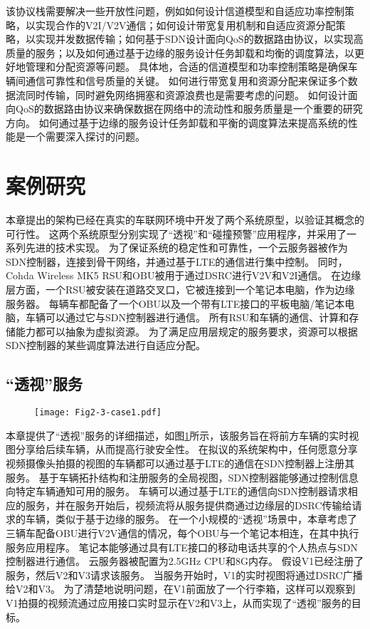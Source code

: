 该协议栈需要解决一些开放性问题，例如如何设计信道模型和自适应功率控制策略，以实现合作的V2I/V2V通信；如何设计带宽复用机制和自适应资源分配策略，以实现并发数据传输；如何基于SDN设计面向QoS的数据路由协议，以实现高质量的服务；以及如何通过基于边缘的服务设计任务卸载和均衡的调度算法，以更好地管理和分配资源等问题。
具体地，合适的信道模型和功率控制策略是确保车辆间通信可靠性和信号质量的关键。
如何进行带宽复用和资源分配来保证多个数据流同时传输，同时避免网络拥塞和资源浪费也是需要考虑的问题。
如何设计面向QoS的数据路由协议来确保数据在网络中的流动性和服务质量是一个重要的研究方向。
如何通过基于边缘的服务设计任务卸载和平衡的调度算法来提高系统的性能是一个需要深入探讨的问题。

\section{案例研究}\label{section 2-4}

本章提出的架构已经在真实的车联网环境中开发了两个系统原型，以验证其概念的可行性。
这两个系统原型分别实现了“透视”和“碰撞预警”应用程序，并采用了一系列先进的技术实现。
为了保证系统的稳定性和可靠性，一个云服务器被作为SDN控制器，连接到骨干网络，并通过基于LTE的通信进行集中控制。
同时，Cohda Wireless MK5 RSU和OBU被用于通过DSRC进行V2V和V2I通信。
在边缘层方面，一个RSU被安装在道路交叉口，它被连接到一个笔记本电脑，作为边缘服务器。
每辆车都配备了一个OBU以及一个带有LTE接口的平板电脑/笔记本电脑，车辆可以通过它与SDN控制器进行通信。
所有RSU和车辆的通信、计算和存储能力都可以抽象为虚拟资源。
为了满足应用层规定的服务要求，资源可以根据SDN控制器的某些调度算法进行自适应分配。

\subsection{“透视”服务}

\begin{figure}[h] 
	\centering
	\texttt{[image: Fig2-3-case1.pdf]}
	\label{fig 2-3}
\end{figure}

本章提供了“透视”服务的详细描述，如图\ref{fig 2-3}所示，该服务旨在将前方车辆的实时视图分享给后续车辆，从而提高行驶安全性。
在拟议的系统架构中，任何愿意分享视频摄像头拍摄的视图的车辆都可以通过基于LTE的通信在SDN控制器上注册其服务。
基于车辆拓扑结构和注册服务的全局视图，SDN控制器能够通过控制信息向特定车辆通知可用的服务。
车辆可以通过基于LTE的通信向SDN控制器请求相应的服务，并在服务开始后，视频流将从服务提供商通过边缘层的DSRC传输给请求的车辆，类似于基于边缘的服务。
在一个小规模的“透视”场景中，本章考虑了三辆车配备OBU进行V2V通信的情况，每个OBU与一个笔记本相连，在其中执行服务应用程序。
笔记本能够通过具有LTE接口的移动电话共享的个人热点与SDN控制器进行通信。
云服务器被配置为2.5GHz CPU和8G内存。
假设V1已经注册了服务，然后V2和V3请求该服务。
当服务开始时，V1的实时视图将通过DSRC广播给V2和V3。
为了清楚地说明问题，在V1前面放了一个行李箱，这样可以观察到V1拍摄的视频流通过应用接口实时显示在V2和V3上，从而实现了“透视”服务的目标。

